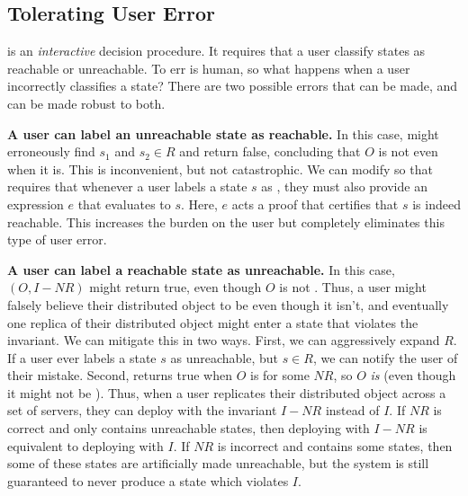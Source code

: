 {}

\subsection{Tolerating User Error}
 is an \emph{interactive} decision
procedure. It requires that a user classify states as reachable or unreachable.
To err is human, so what happens when a user incorrectly classifies a state?
There are two possible errors that can be made, and
 can be made robust to both.

\textbf{A user can label an unreachable state as reachable.}
In this case, \Helper{} might erroneously find $s_1$ and $s_2 \in R$ and return
false, concluding that $O$ is not \sTIconfluent{} even when it is.  This is
inconvenient, but not catastrophic. We can modify
 so that \Helper{} requires that whenever
a user labels a state $s$ as \sTIreachable{}, they must also provide an
\sTIreachable{} expression $e$ that evaluates to $s$. Here, $e$ acts a proof
that certifies that $s$ is indeed reachable. This increases the burden on the
user but completely eliminates this type of user error.

\textbf{A user can label a reachable state as unreachable.}
In this case, \IsIclosed$(O, I - NR)$ might return true, even though $O$ is not
\sTIconfluent. Thus, a user might falsely believe their distributed object to
be \sTIconfluent{} even though it isn't, and eventually one replica of their
distributed object might enter a state that violates the invariant.
%
We can mitigate this in two ways. First, we can aggressively expand $R$. If a
user ever labels a state $s$ as unreachable, but $s \in R$, we can notify the
user of their mistake. Second, \Helper{} returns true when $O$ is  for some $NR$, so $O$ \emph{is}  (even though
it might not be \sTIconfluent{}). Thus, when a user replicates their
distributed object across a set of servers, they can deploy with the invariant
$I - NR$ instead of $I$. If $NR$ is correct and only contains unreachable
states, then deploying with $I - NR$ is equivalent to deploying with $I$. If
$NR$ is incorrect and contains some \sTIreachable{} states, then some of these
states are artificially made unreachable, but the system is still guaranteed to
never produce a state which violates $I$.
